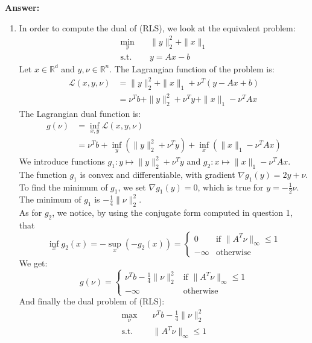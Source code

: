 \documentclass[11pt,a4paper]{article}
\newenvironment{solution}{
  \par\noindent\textbf{Answer:}\vspace{0.3em}
}{\vspace{1em}}
\begin{document}
\begin{solution}
\begin{enumerate}
        \item In order to compute the dual of (RLS), we look at the equivalent problem: $$\begin{aligned}
            \min_{y} \quad & \|y\|_2^2 + \|x\|_1\\
            \text{s.t.} \quad & y = Ax - b
        \end{aligned}$$
        Let $x \in \mathbb{R^d}$ and $y, \nu \in \mathbb{R}^n$. The Lagrangian function of the problem is: $$\begin{aligned}
            \mathcal{L}(x, y, \nu)
            &= \|y\|_2^2 + \|x\|_1 + \nu^T (y - Ax + b)\\
            &= \nu^T b + \|y\|_2^2 + \nu^T y + \|x\|_1 - \nu^T A x
        \end{aligned}$$
        The Lagrangian dual function is: $$\begin{aligned}
            g(\nu)
            &= \inf_{x,y} \mathcal{L}(x, y, \nu)\\
            &= \nu^T b + \inf_y \left( \|y\|_2^2 + \nu^T y \right) + \inf_x \left( \|x\|_1 - \nu^T A x \right)
        \end{aligned}$$
        We introduce functions $g_1 : y \mapsto \|y\|_2^2 + \nu^T y$ and $g_2 : x \mapsto \|x\|_1 - \nu^T A x$.\\
        The function $g_1$ is convex and differentiable, with gradient $\nabla g_1(y) = 2y + \nu$. To find the minimum of $g_1$, we set $\nabla g_1(y) = 0$, which is true for $y = -\frac{1}{2}\nu$. The minimum of $g_1$ is $-\frac{1}{4} \| \nu \|_2^2$.\\
        As for $g_2$, we notice, by using the conjugate form computed in question 1, that $$\inf_x g_2 (x) = -\sup_x (-g_2(x)) = \begin{cases}
            0 &\text{if } \|A^T \nu\|_\infty \leq 1\\
            -\infty &\text{otherwise}
        \end{cases}$$
        We get: $$g(\nu) = \begin{cases}
            \nu^T b - \frac{1}{4} \| \nu \|_2^2 &\text{if } \|A^T \nu\|_\infty \leq 1\\
            -\infty &\text{otherwise}
        \end{cases}$$
        And finally the dual problem of (RLS): $$\begin{aligned}
            \max_\nu \quad & \nu^T b - \frac{1}{4} \| \nu \|_2^2\\
            \text{s.t.} \quad & \|A^T \nu\|_\infty \leq 1
        \end{aligned}$$
    \end{enumerate}
\end{solution}
\end{document}
